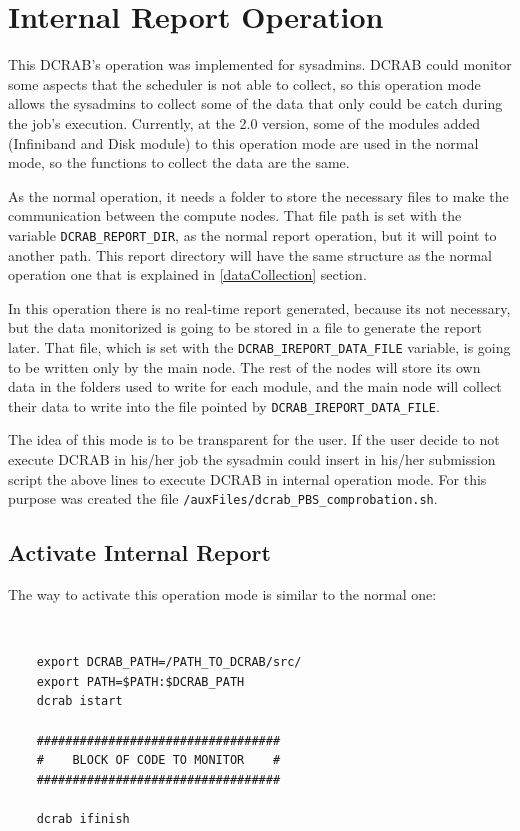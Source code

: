 \documentclass[10pt,a4paper]{report}
\begin{document}
\chapter{Internal Report Operation}

This DCRAB's operation was implemented for sysadmins. DCRAB could monitor some aspects that the scheduler is not able to collect, so this operation mode allows the sysadmins to collect some of the data that only could be catch during the job's execution. Currently, at the 2.0 version, some of the modules added (Infiniband and Disk module) to this operation mode are used in the normal mode, so the functions to collect the data are the same.

As the normal operation, it needs a folder to store the necessary files to make the communication between the compute nodes. That file path is set with the variable \verb+DCRAB_REPORT_DIR+, as the normal report operation, but it will point to another path. This report directory will have the same structure as the normal operation one that is explained in \ref{dataCollection} section.

In this operation there is no real-time report generated, because its not necessary, but the data monitorized is going to be stored in a file to generate the report later. That file, which is set with the \verb+DCRAB_IREPORT_DATA_FILE+ variable, is going to be written only by the main node. The rest of the nodes will store its own data in the folders used to write for each module, and the main node will collect their data to write into the file pointed by \verb+DCRAB_IREPORT_DATA_FILE+.

The idea of this mode is to be transparent for the user. If the user decide to not execute DCRAB in his/her job the sysadmin could insert in his/her submission script the above lines to execute DCRAB in internal operation mode. For this purpose was created the file \verb+/auxFiles/dcrab_PBS_comprobation.sh+.


\section{Activate Internal Report}
\label{internalReport}
The way to activate this operation mode is similar to the normal one:

\ \

\begin{verbatim}
    export DCRAB_PATH=/PATH_TO_DCRAB/src/
    export PATH=$PATH:$DCRAB_PATH
    dcrab istart

    ##################################
    #    BLOCK OF CODE TO MONITOR    #
    ##################################

    dcrab ifinish
\end{verbatim}
\end{document}
